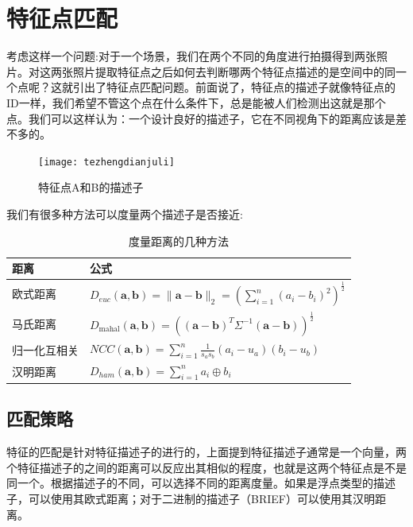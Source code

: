\section{特征点匹配}
考虑这样一个问题:对于一个场景，我们在两个不同的角度进行拍摄得到两张照片。对这两张照片提取特征点之后如何去判断哪两个特征点描述的是空间中的同一个点呢？这就引出了特征点匹配问题。前面说了，特征点的描述子就像特征点的ID一样，我们希望不管这个点在什么条件下，总是能被人们检测出这就是那个点。我们可以这样认为：一个设计良好的描述子，它在不同视角下的距离应该是差不多的。\par
\begin{figure}[H]
	\centering
	\texttt{[image: tezhengdianjuli]}
	\caption{特征点A和B的描述子}
\end{figure}
我们有很多种方法可以度量两个描述子是否接近:
\begin{table}[htb]
	\centering
	\caption{度量距离的几种方法}
	\begin{tabular}{ll}
		\toprule
		距离 & 公式\\
		\midrule
		欧式距离 & $D_{e u c}(\boldsymbol{a}, \boldsymbol{b})=\|\boldsymbol{a}-\boldsymbol{b}\|_{2}=\left(\sum_{i=1}^{n}\left(a_{i}-b_{i}\right)^{2}\right)^{\frac{1}{2}}$ \\
		马氏距离 & $D_{\text {mahal}}(\boldsymbol{a}, \boldsymbol{b})=\left((\boldsymbol{a}-\boldsymbol{b})^{T} \Sigma^{-1}(\boldsymbol{a}-\boldsymbol{b})\right)^{\frac{1}{2}}$   \\
		归一化互相关 & $N C C(\boldsymbol{a}, \boldsymbol{b})=\sum_{i=1}^{n} \frac{1}{s_{a} s_{b}}\left(a_{i}-u_{a}\right)\left(b_{i}-u_{b}\right)$       \\
		汉明距离 & $D_{h a m}(\boldsymbol{a}, \boldsymbol{b})=\sum_{i=1}^{n} a_{i} \oplus b_{i}$\\
		\bottomrule	
	\end{tabular}
\end{table}
\subsection{匹配策略}
特征的匹配是针对特征描述子的进行的，上面提到特征描述子通常是一个向量，两个特征描述子的之间的距离可以反应出其相似的程度，也就是这两个特征点是不是同一个。根据描述子的不同，可以选择不同的距离度量。如果是浮点类型的描述子，可以使用其欧式距离；对于二进制的描述子（BRIEF）可以使用其汉明距离。\par
